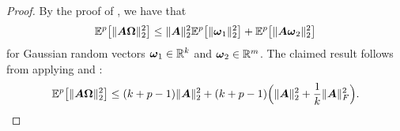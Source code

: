 \begin{proof}
    By the proof of \cite[Lemma B.1]{tropp-2023-randomized-algorithms}, we have that
    \begin{equation}
        \mathbb{E}^{p}\big[ \lVert \boldsymbol{A} \boldsymbol{\Omega} \rVert _2^2 \big]
        \leq \lVert \boldsymbol{A} \rVert _2^2 \mathbb{E}^{p}\big[ \lVert \boldsymbol{\omega}_1 \rVert _2^2 \big] + \mathbb{E}^{p}\big[ \lVert \boldsymbol{A} \boldsymbol{\omega}_2 \rVert _2^2 \big]
    \end{equation}
    for Gaussian random vectors $\boldsymbol{\omega}_1 \in \mathbb{R}^{k}$ and $\boldsymbol{\omega}_2 \in \mathbb{R}^{m}$. The claimed result follows from applying  and :
    \[
        \mathbb{E}^{p}\big[ \lVert \boldsymbol{A} \boldsymbol{\Omega} \rVert _2^2 \big]
        \leq (k + p - 1) \lVert \boldsymbol{A} \rVert _2^2  + (k + p - 1) \Big( \lVert \boldsymbol{A} \rVert _2^2 + \frac{1}{k} \lVert \boldsymbol{A} \rVert _F^2 \Big).
    \]
\end{proof}


